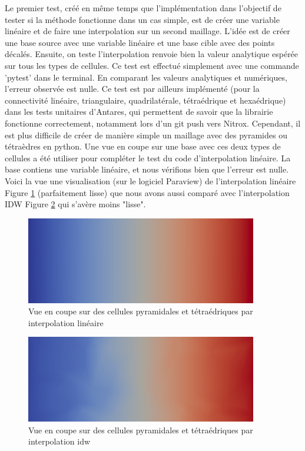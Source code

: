 Le premier test, créé en même temps que l'implémentation dans l'objectif de tester si la méthode fonctionne dans un cas simple, est de créer une variable linéaire et de faire une interpolation sur un second maillage. L'idée est de créer une base source avec une variable linéaire et une base cible avec des points décalés. Ensuite, on teste l'interpolation renvoie bien la valeur analytique espérée sur tous les types de cellules. Ce test est effectué simplement avec une commande 'pytest' dans le terminal. En comparant les valeurs analytiques et numériques, l'erreur observée est nulle. Ce test est par ailleurs implémenté (pour la connectivité linéaire, triangulaire, quadrilatérale, tétraédrique et hexaédrique) dans les tests unitaires d'Antares, qui permettent de savoir que la librairie fonctionne correctement, notamment lors d'un git push vers Nitrox. Cependant, il est plus difficile de créer de manière simple un maillage avec des pyramides ou tétraèdres en python. Une vue en coupe sur une base avec ces deux types de cellules a été utiliser pour compléter le test du code d'interpolation linéaire. La base contiens une variable linéaire, et nous vérifions bien que l'erreur est nulle. Voici la vue une visualisation (sur le logiciel Paraview) de l'interpolation linéaire Figure \ref{fig:lin_pyr_tet} (parfaitement lisse) que nous avons aussi comparé avec l'interpolation IDW Figure \ref{fig:idw_pyr_tet} qui s'avère moins "lisse".
\begin{figure}[H]
    \centering
    \includegraphics[width=0.90\textwidth]{images/lin_pyr_tet.png}
    \caption{Vue en coupe sur des cellules pyramidales et tétraédriques par interpolation linéaire}
    \label{fig:lin_pyr_tet}
\end{figure}
\begin{figure}[H]
    \centering
    \includegraphics[width=0.90\textwidth]{images/idw_pyr_tet.png}
    \caption{Vue en coupe sur des cellules pyramidales et tétraédriques par interpolation idw}
    \label{fig:idw_pyr_tet}
\end{figure}


